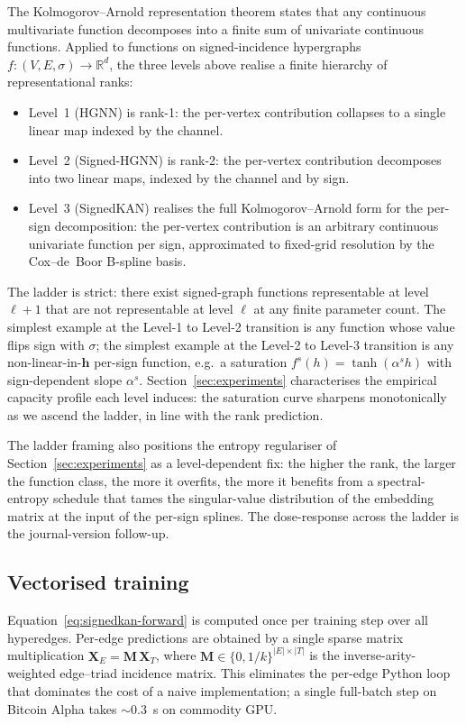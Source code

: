 The Kolmogorov--Arnold representation theorem states that any
continuous multivariate function decomposes into a finite sum of
univariate continuous functions. Applied to functions on
signed-incidence hypergraphs $f : (V, E, \sigma) \to \mathbb{R}^d$,
the three levels above realise a finite hierarchy of
representational ranks:

\begin{itemize}
\item Level~1 (HGNN) is rank-1: the per-vertex contribution
  collapses to a single linear map indexed by the channel.
\item Level~2 (Signed-HGNN) is rank-2: the per-vertex
  contribution decomposes into two linear maps, indexed by the
  channel and by sign.
\item Level~3 (SignedKAN) realises the full
  Kolmogorov--Arnold form for the per-sign decomposition: the
  per-vertex contribution is an arbitrary continuous univariate
  function per sign, approximated to fixed-grid resolution by
  the Cox--de~Boor B-spline basis.
\end{itemize}

The ladder is strict: there exist signed-graph functions
representable at level $\ell+1$ that are not representable at
level $\ell$ at any finite parameter count. The simplest example
at the Level-1 to Level-2 transition is any function whose value
flips sign with $\sigma$; the simplest example at the Level-2 to
Level-3 transition is any non-linear-in-$\mathbf{h}$ per-sign
function, e.g.\ a saturation $f^{s}(h) = \tanh(\alpha^{s} h)$
with sign-dependent slope $\alpha^{s}$. Section~\ref{sec:experiments}
characterises the empirical capacity profile each level induces:
the saturation curve sharpens monotonically as we ascend the
ladder, in line with the rank prediction.

The ladder framing also positions the entropy regulariser of
Section~\ref{sec:experiments} as a level-dependent fix: the
higher the rank, the larger the function class, the more it
overfits, the more it benefits from a spectral-entropy schedule
that tames the singular-value distribution of the embedding
matrix at the input of the per-sign splines. The dose-response
across the ladder is the journal-version follow-up.

\subsection{Vectorised training}

Equation~\eqref{eq:signedkan-forward} is computed once per training
step over all hyperedges. Per-edge predictions are obtained by a
single sparse matrix multiplication $\mathbf{X}_E = \mathbf{M} \,
\mathbf{X}_T$, where $\mathbf{M} \in \{0, 1/k\}^{|E| \times |T|}$ is
the inverse-arity-weighted edge--triad incidence matrix. This
eliminates the per-edge Python loop that dominates the cost of a
naive implementation; a single full-batch step on Bitcoin Alpha takes
$\sim 0.3$~s on commodity GPU.

